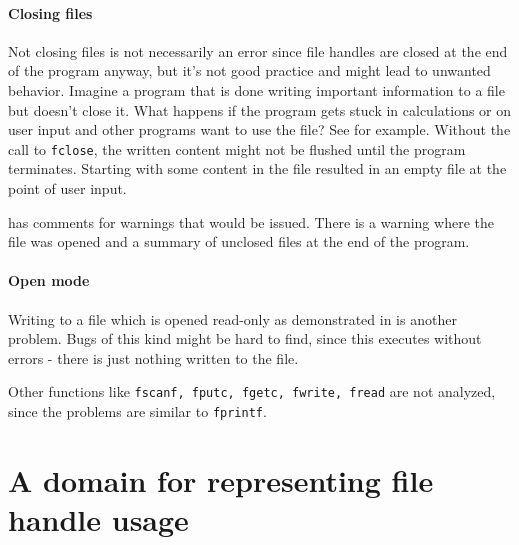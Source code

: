 \paragraph*{Closing files}
Not closing files is not necessarily an error since file handles are closed at the end of the program anyway, but it's not good practice and might lead to unwanted behavior.
Imagine a program that is done writing important information to a file but doesn't close it. What happens if the program gets stuck in calculations or on user input and other programs want to use the file? See  for example. Without the call to \verb|fclose|, the written content might not be flushed until the program terminates. Starting with some content in the file resulted in an empty file at the point of user input.

 has comments for warnings that would be issued. There is a warning where the file was opened and a summary of unclosed files at the end of the program.

\paragraph*{Open mode}
Writing to a file which is opened read-only as demonstrated in  is another problem. Bugs of this kind might be hard to find, since this executes without errors - there is just nothing written to the file.

Other functions like \verb|fscanf, fputc, fgetc, fwrite, fread| are not analyzed, since the problems are similar to \verb|fprintf|.


\section{A domain for representing file handle usage}


